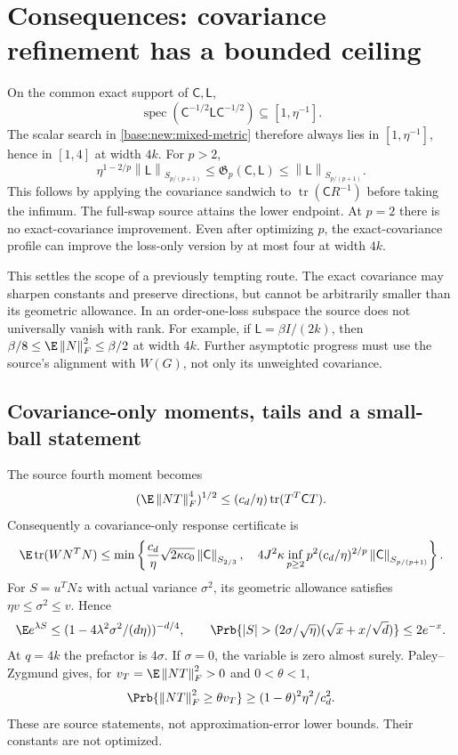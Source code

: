 \documentclass[11pt,oneside,openany,a4paper]{book}
\numberwithin{equation}{chapter}
\theoremstyle{definition}
\theoremstyle{remark}
\newcommand{\F}[1]{\left\lVert#1\right\rVert_F}
\DeclareMathOperator{\tr}{tr}\DeclareMathOperator{\rank}{rank}
\newcommand{\Sn}[2]{\left\lVert#1\right\rVert_{S_{#2}}}
\newcommand{\Cov}{\mathsf C}\newcommand{\Loss}{\mathsf L}\newcommand{\Fil}{\mathcal F}
\begin{document}
\section{Consequences: covariance refinement has a bounded ceiling}\label{base:new:cov-consequences}
On the common exact support of $\Cov,\Loss$,
\[
 \operatorname{spec}(\Cov^{-1/2}\Loss\Cov^{-1/2})\subseteq[1,\eta^{-1}].
\]
The scalar search in \eqref{base:new:mixed-metric} therefore always lies in $[1,\eta^{-1}]$, hence in $[1,4]$ at width $4k$. For $p>2$,
\begin{equation}\label{base:new:metric-ceiling}
 \eta^{1-2/p}\Sn\Loss{p/(p+1)}
 \le\mathfrak G_p(\Cov,\Loss)\le\Sn\Loss{p/(p+1)}.
\end{equation}
This follows by applying the covariance sandwich to $\tr(\Cov R^{-1})$ before taking the infimum. The full-swap source attains the lower endpoint. At $p=2$ there is no exact-covariance improvement. Even after optimizing $p$, the exact-covariance profile can improve the loss-only version by at most four at width $4k$.

This settles the scope of a previously tempting route. The exact covariance may sharpen constants and preserve directions, but cannot be arbitrarily smaller than its geometric allowance. In an order-one-loss subspace the source does not universally vanish with rank. For example, if $\Loss=\beta I/(2k)$, then $\beta/8\le\E\F N^2\le\beta/2$ at width $4k$. Further asymptotic progress must use the source's alignment with $W(G)$, not only its unweighted covariance.

\subsection{Covariance-only moments, tails and a small-ball statement}
The source fourth moment becomes
\[
 (\E\F{NT}^4)^{1/2}\le(c_d/\eta)\tr(T^T\Cov T).
\]
Consequently a covariance-only response certificate is
\[
 \E\tr(WN^TN)\le\min\left\{
 \frac{c_d}{\eta}\sqrt{2\kappa c_0}\Sn\Cov{2/3},\quad
 4J^2\kappa\inf_{p\ge2}p^2(c_d/\eta)^{2/p}\Sn\Cov{p/(p+1)}
 \right\}.
\]
For $S=u^TNz$ with actual variance $\sigma^2$, its geometric allowance satisfies $\eta v\le\sigma^2\le v$. Hence
\[
 \E e^{\lambda S}\le(1-4\lambda^2\sigma^2/(d\eta))^{-d/4},
 \qquad
 \Prb\{|S|>(2\sigma/\sqrt\eta)(\sqrt x+x/\sqrt d)\}\le2e^{-x}.
\]
At $q=4k$ the prefactor is $4\sigma$. If $\sigma=0$, the variable is zero almost surely. Paley--Zygmund gives, for $v_T=\E\F{NT}^2>0$ and $0<\theta<1$,
\[
 \Prb\{\F{NT}^2\ge\theta v_T\}\ge(1-\theta)^2\eta^2/c_d^2.
\]
These are source statements, not approximation-error lower bounds. Their constants are not optimized.
\end{document}
